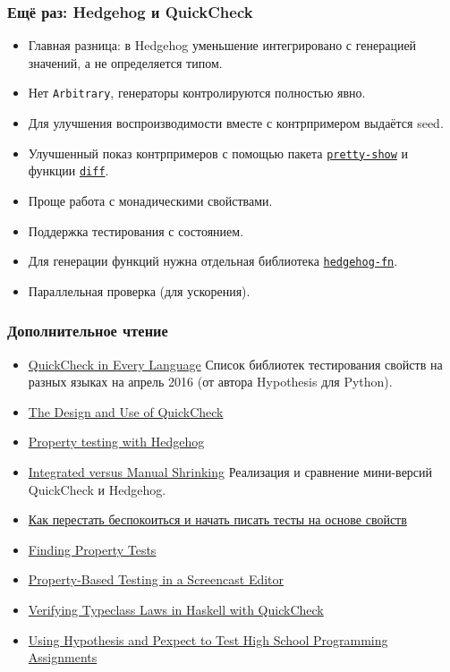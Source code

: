 \documentclass[11pt]{beamer}
\begin{document}
\begin{frame}[fragile]
\frametitle{Ещё раз: Hedgehog и QuickCheck}
\begin{itemize}
    \item Главная разница: в Hedgehog уменьшение интегрировано с генерацией значений, а не определяется типом.
    \item Нет \lstinline|Arbitrary|, генераторы контролируются полностью явно.
    \item Для улучшения воспроизводимости вместе с контрпримером выдаётся seed.
    \item Улучшенный показ контрпримеров с помощью пакета \href{https://hackage.haskell.org/package/pretty-show}{\lstinline|pretty-show|} и функции \href{http://hackage.haskell.org/package/hedgehog-1.0/docs/Hedgehog.html#v:diff}{\lstinline|diff|}.
    \item Проще работа с монадическими свойствами.
    \item Поддержка тестирования с состоянием.
    \item Для генерации функций нужна отдельная библиотека \href{https://hackage.haskell.org/package/hedgehog-fn}{\lstinline|hedgehog-fn|}.
    \item Параллельная проверка (для ускорения).
\end{itemize}
\end{frame}

\begin{frame}[fragile]
\frametitle{Дополнительное чтение}
\begin{itemize}
    \item \href{https://hypothesis.works/articles/quickcheck-in-every-language/}{QuickCheck in Every Language} Список библиотек тестирования свойств на разных языках на апрель 2016 (от автора Hypothesis для Python).
    \item \href{https://begriffs.com/posts/2017-01-14-design-use-quickcheck.html}{The Design and Use of QuickCheck}
    \item \href{https://teh.id.au/posts/2017/04/23/property-testing-with-hedgehog/}{Property testing with Hedgehog}
    \item \href{http://www.well-typed.com/blog/2019/05/integrated-shrinking/}{Integrated versus Manual Shrinking} Реализация и сравнение мини-версий QuickCheck и Hedgehog.
    \item \href{https://habr.com/ru/post/434008/}{Как перестать беспокоиться и начать писать тесты на основе свойств}
    \item \href{https://www.hillelwayne.com/post/contract-examples/}{Finding Property Tests}
    \item \href{https://wickstrom.tech/programming/2019/03/02/property-based-testing-in-a-screencast-editor-introduction.html}{Property-Based Testing in a Screencast Editor} 
    \item \href{https://austinrochford.com/posts/2014-05-27-quickcheck-laws.html}{Verifying Typeclass Laws in Haskell with QuickCheck}
    \item \href{https://blog.jrheard.com/hypothesis-and-pexpect}{Using Hypothesis and Pexpect to Test High School Programming Assignments}
    \end{itemize}
\end{frame}
\end{document}
